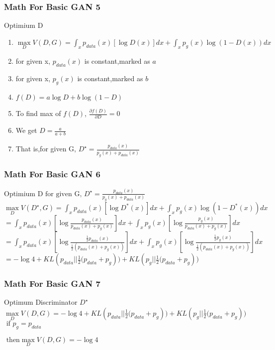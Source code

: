 \documentclass{beamer}[10]
\begin{document}
\begin{frame}
  \frametitle{Math For Basic GAN 5}
  \begin{block}{Optimium D }
    \begin{enumerate}
      \item $\max \limits_{D} V(D,G) = \int_{x} p_{data}(x)[\log D(x)] dx + \int_{x} p_g(x) \log (1 - D(x)) dx $
      \item for given x,  $p_{data}(x)$ is constant,marked as $a$   
      \item for given x, $p_g(x)$ is constant,marked as  $b$  
      \item $f(D) = a \log D + b \log(1-D)$
      \item To find max of $f(D)$, $ \frac{\partial f(D)}{\partial D} = 0 $
      \item We get $D = \frac{a}{a+b} $
      \item That is,for given G, $D^\star = \frac{p_{data}(x)}{p_g(x) + p_{data}(x)}$
    \end{enumerate}
  \end{block}
\end{frame}

\begin{frame}
  \frametitle{Math For Basic GAN 6}
  \begin{block}{Optimium D }
    $ \mbox{for given G, }D^\star = \frac{p_{data}(x)}{p_g(x) + p_{data}(x)} $ \\
      $ \max \limits_{D} V(D^\star,G) = \int_{x} p_{data}(x) [\log D^*(x)] dx + \int_{x} p_g(x) \log (1 - D^*(x)) dx $ \\
      $ = \int_{x} p_{data}(x) [\log \frac{p_{data}(x)}{p_{data}(x) + p_g(x)}] dx + \int_{x} p_g(x) [\log \frac{p_g(x)}{p_{data}(x) + p_g(x)}] dx $ \\
      $ = \int_{x} p_{data}(x) [\log \frac{\frac{1}{2}p_{data}(x)}{\frac{1}{2}(p_{data}(x) + p_g(x))}] dx + \int_{x} p_g(x) [\log \frac{\frac{1}{2}p_g(x)}{\frac{1}{2}(p_{data}(x) + p_g(x))}] dx $
      $ = -\log 4 + KL(p_{data} || {\frac{1}{2}(p_{data} + p_g} )) + KL(p_{g} || {\frac{1}{2}(p_{data} + p_g})) $ 
  \end{block}
\end{frame}

\begin{frame}
  \frametitle{Math For Basic GAN 7}
  \begin{block}{Optimum Discriminator $D^\star$}
    $ \max \limits_{D} V(D,G) =  -\log 4 + KL(p_{data} || {\frac{1}{2}(p_{data} + p_g} )) + KL(p_{g} || {\frac{1}{2}(p_{data} + p_g})) $ 
    $ \mbox{ if } p_g = p_{data} $

    $ \mbox{ then} \max \limits_{D} V(D,G) = -\log 4 $
  \end{block}
\end{frame}
\end{document}
